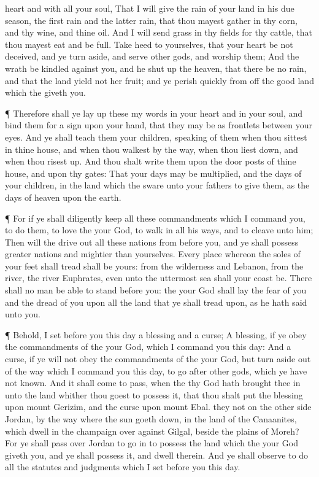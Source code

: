 {heart and with all your
soul,
That I will
give
{} the
rain of your
land in his due
season, the first
rain and the latter
rain, that thou mayest
gather in thy
corn, and thy
wine, and thine
oil.
And I will
send
grass in thy
fields for thy
cattle, that thou mayest
eat and be
full.
Take
heed to yourselves, that your
heart be not
deceived, and ye turn
aside, and
serve
other
gods, and
worship them;
And
{} the
{}
wrath be
kindled against you, and he shut
up the
heaven, that there be no
rain, and that the
land
yield not her
fruit; and
{} ye
perish
quickly from off the
good
land which the
{}
giveth you.
\par }{\PP {}¶ Therefore shall ye lay
up these my
words in your
heart and in your
soul, and
bind them for a
sign upon your
hand, that they may be as
frontlets between your
eyes.
And ye shall
teach them your
children,
speaking of them when thou
sittest in thine
house, and when thou
walkest by the
way, when thou
liest down, and when thou risest
up.
And thou shalt
write them upon the door
posts of thine
house, and upon thy
gates:
That your
days may be
multiplied, and the
days of your
children, in the
land which the
{}
sware unto your
fathers to
give them, as the
days of
heaven upon the
earth.
\par }{\PP {}¶ For if ye shall
diligently
keep all these
commandments which I
command you, to
do them, to
love the
{} your
God, to
walk in all his
ways, and to
cleave unto him;
Then will the
{} drive
out all these
nations from
before you, and ye shall
possess
greater
nations and
mightier than yourselves.
Every
place whereon the
soles of your
feet shall
tread shall be yours: from the
wilderness and
Lebanon, from the
river, the
river
Euphrates, even unto the
uttermost
sea shall your
coast be.
There shall no
man be able to
stand
before you:
{} the
{} your
God shall
lay the
fear of you and the
dread of you
upon all the
land that ye shall
tread upon, as he hath
said unto you.
\par }{\PP {}¶
Behold, I
set
before you this
day a
blessing and a
curse;
A
blessing, if ye
obey the
commandments of the
{} your
God, which I
command you this
day:
And a
curse, if ye will not
obey the
commandments of the
{} your
God, but turn
aside out of the
way which I
command you this
day, to
go
after
other
gods, which ye have not
known.
And it shall come to pass, when the
{} thy
God hath brought thee
in unto the
land whither thou
goest to
possess it, that thou shalt
put the
blessing upon
mount
Gerizim, and the
curse upon
mount
Ebal.
 they not on the other
side
Jordan,
by the
way where the
sun goeth
down, in the
land of the
Canaanites, which
dwell in the
champaign over
against
Gilgal,
beside the
plains of
Moreh?
For ye shall pass
over
Jordan to go
in to
possess the
land which the
{} your
God
giveth you, and ye shall
possess it, and
dwell therein.
And ye shall
observe to
do all the
statutes and
judgments which I
set
before you this
day.

}
